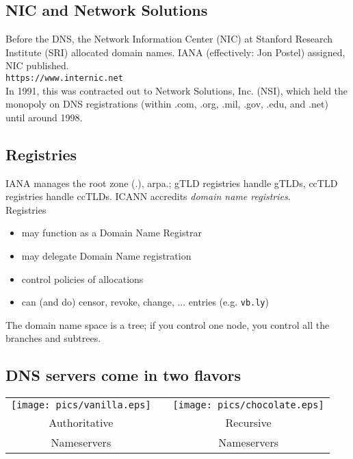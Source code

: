 \documentclass[xga]{xdvislides}
\begin{document}
\subsection{NIC and Network Solutions}
Before the DNS, the Network Information Center (NIC)
at Stanford Research Institute (SRI) allocated domain
names. IANA (effectively: Jon Postel) assigned, NIC
published.  \\

{\tt https://www.internic.net} \\

In 1991, this was contracted out to Network Solutions,
Inc. (NSI), which held the monopoly on DNS
registrations (within .com, .org, .mil, .gov, .edu, and
.net) until around 1998. \\


\subsection{Registries}
IANA manages the root zone (.), arpa.; gTLD registries
handle gTLDs, ccTLD registries handle ccTLDs.  ICANN
accredits {\em domain name registries}. \\

Registries
\begin{itemize}
	\item may function as a Domain Name Registrar
	\item may delegate Domain Name registration
	\item control policies of allocations
	\item can (and do) censor, revoke, change, ... entries (e.g. {\tt vb.ly})
\end{itemize}

\vspace{.5in}
The domain name space is a tree; if you control one
node, you control all the branches and subtrees.

\subsection{DNS servers come in two flavors}
\vspace*{\fill}
\begin{center}
	\begin{tabular}{ c c c }
	\texttt{[image: pics/vanilla.eps]} & \hspace{.5in} & \texttt{[image: pics/chocolate.eps]} \\
	\hspace{.3in} \Huge Authoritative & & \hspace{.3in} \Huge Recursive \\
	\hspace{.3in} \Huge Nameservers & & \hspace{.3in} \Huge Nameservers \\
	\end{tabular}
\end{center}
\vspace*{\fill}
\end{document}
